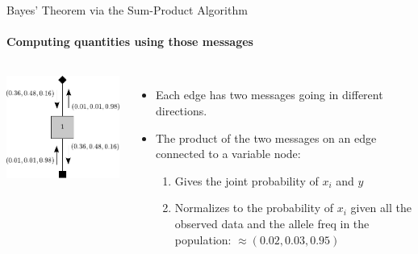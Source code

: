 \documentclass[letter,graphicx]{beamer}
\begin{document}
\begin{frame}{Bayes' Theorem via the Sum-Product Algorithm}
\framesubtitle{Computing quantities using those messages}

\begin{columns}
\includegraphics[height = 0.45\textheight]{./images/single-node-sum-product-d.pdf}
\begin{itemize}
\item Each edge has two messages going in different directions.
\item The product of the two messages on an edge connected to a variable node:
\begin{enumerate}
\item Gives the joint probability of $x_i$ and $y$ 
\item Normalizes to the probability of $x_i$ given all the observed data and the allele freq in the population: $\mbox{}\approx (0.02, 0.03, 0.95)$
\end{enumerate}
\end{itemize}
\end{columns}
\end{frame}
\end{document}
